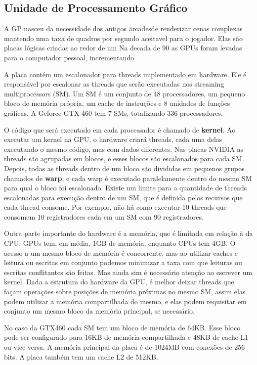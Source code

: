 \subsection{Unidade de Processamento Gráfico}
    A GP nasceu da necessidade dos antigos \"arcades\" de renderizar cenas complexas mantendo uma taxa de quadros por 
segundo aceitavel para o jogador. Elas são placas lógicas criadas ao redor de um Na decada de 90 as GPUs foram levadas para o computador pessoal, incrementando 

A placa contém um escalonador para threads implementado em hardware. Ele é responsável por escalonar as threads que serão
executadas nos streaming multiprocessors (SM). Um SM é um conjunto de 48 processadores, um pequeno bloco de memória própria,
um cache de instruções e 8 unidades de funções gráficas. A Geforce GTX 460 tem 7 SMs, totalizando 336 processadores.

O código que será executado em cada processador é chamado de \textbf{kernel}. Ao executar um kernel na GPU, o 
hardware criará threads, cada uma delas executando o mesmo código, mas com dados diferentes. Nas placas NVIDIA as threads 
são agrupadas em blocos, e esses blocos são escalonados para cada SM. Depois, todas as threads dentro de um bloco são 
divididas em pequenos grupos chamados de \textbf{warp}\cite{paulo}, e cada warp é executado paralelamente dentro do 
mesmo SM para qual o bloco foi escalonado. Existe um limite para a quantidade de threads escalonadas para execução
dentro de um SM, que é definida pelos recursos que cada thread consome. Por exemplo, não há como executar 10 threads
que consomem 10 registradores cada em um SM com 90 registradores.

Outra parte importante do hardware é a memória, que é limitada em relação à da CPU. GPUs tem, em média, 1GB
de memória, enquanto CPUs tem 4GB. O acesso a um mesmo bloco de memória é concorrente, mas ao utilizar caches e leitura ou escritas em
conjunto podemos minimizar a taxa com que leituras ou escritas conflitantes são feitas. Mas ainda sim é necessário atenção ao escrever um
kernel. Dada a estrutura do hardware da GPU, é melhor deixar threads que façam operações sobre posições de memória próximas no mesmo
SM, assim elas podem utilizar a memória compartilhada do mesmo, e elas podem requisitar em conjunto um mesmo bloco da memória principal,
se necessário.

No caso da GTX460 cada SM tem um bloco de memória de 64KB. Esse bloco pode ser configurado para 16KB de memória compartilhada e 48KB
de cache L1 ou vice versa. A memória principal da placa é de 1024MB com conexões de 256 bits. A placa também tem um
cache L2 de 512KB.


